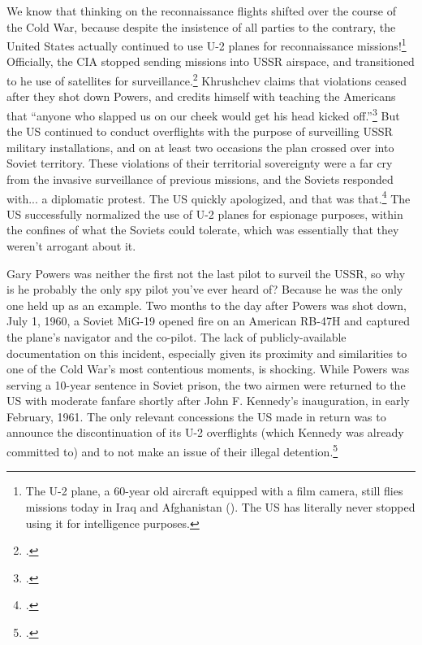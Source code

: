 \documentclass[12pt]{article}
\begin{document}
We know that thinking on the reconnaissance flights shifted over the course of the Cold War, because despite the insistence of all parties to the contrary, the United States actually continued to use U-2 planes for reconnaissance missions!\footnote{The U-2 plane, a 60-year old aircraft equipped with a film camera, still flies missions today in Iraq and Afghanistan (\cite{phillips_u-2_2018}). The US has literally never stopped using it for intelligence purposes.} Officially, the CIA stopped sending missions into USSR airspace, and transitioned to he use of satellites for surveillance.\footcite{orlov_u-2_2007} Khrushchev claims that violations ceased after they shot down Powers, and credits himself with teaching the Americans that ``anyone who slapped us on our cheek would get his head kicked off.''\footcite[p.~449. An important note about Khrushchev's memoirs is that even though they were published after he was ousted, they were still written well before the end of the Cold War, smuggled to the West and published in part in 1970. While his writing is bombastic and of clear bias, it is certainly not pro-West, and there's no reason to suspect that he would be covering for the US here.]{khrushchev_khrushchev_1974} But the US continued to conduct overflights with the purpose of surveilling USSR military installations, and on at least two occasions the plan crossed over into Soviet territory. These violations of their territorial sovereignty were a far cry from the invasive surveillance of previous missions, and the Soviets responded with... a diplomatic protest. The US quickly apologized, and that was that.\footcite{orlov_u-2_2007} The US successfully normalized the use of U-2 planes for espionage purposes, within the confines of what the Soviets could tolerate, which was essentially that they weren't arrogant about it.

Gary Powers was neither the first not the last pilot to surveil the USSR, so why is he probably the only spy pilot you've ever heard of? Because he was the only one held up as an example. Two months to the day after Powers was shot down, July 1, 1960, a Soviet MiG-19 opened fire on an American RB-47H and captured the plane's navigator and the co-pilot. The lack of publicly-available documentation on this incident, especially given its proximity and similarities to one of the Cold War's most contentious moments, is shocking. While Powers was serving a 10-year sentence in Soviet prison, the two airmen were returned to the US with moderate fanfare shortly after John F. Kennedy's inauguration, in early February, 1961. The only relevant concessions the US made in return was to announce the discontinuation of its U-2 overflights (which Kennedy was already committed to) and to not make an issue of their illegal detention.\footcite{time_cold_1961}
\end{document}
